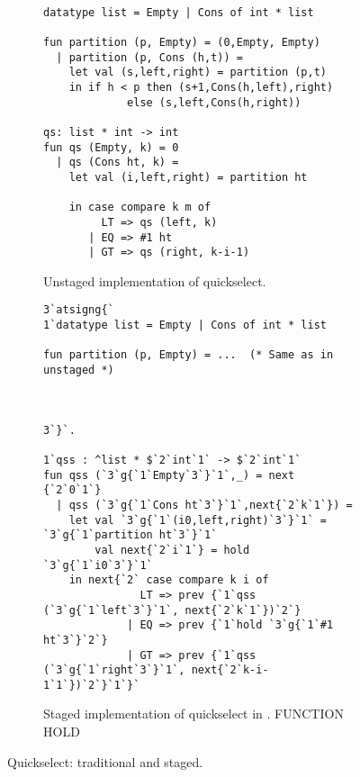 
\begin{figure*}
\begin{subfigure}[t]{0.45\textwidth}
\begin{lstlisting} 

datatype list = Empty | Cons of int * list

fun partition (p, Empty) = (0,Empty, Empty) 
  | partition (p, Cons (h,t)) = 
    let val (s,left,right) = partition (p,t) 
    in if h < p then (s+1,Cons(h,left),right) 
             else (s,left,Cons(h,right))

qs: list * int -> int
fun qs (Empty, k) = 0
  | qs (Cons ht, k) =
    let val (i,left,right) = partition ht

    in case compare k m of
         LT => qs (left, k)
       | EQ => #1 ht
       | GT => qs (right, k-i-1)
\end{lstlisting}
\caption{Unstaged implementation of quickselect.}
\label{fig:qs-unstaged}
\end{subfigure}
\hfill
\begin{subfigure}[t]{0.55\textwidth}
\begin{lstlisting} 
3`atsigng{`  
1`datatype list = Empty | Cons of int * list

fun partition (p, Empty) = ...  (* Same as in unstaged *)



3`}`.

1`qss : ^list * $`2`int`1` -> $`2`int`1`
fun qss (`3`g{`1`Empty`3`}`1`,_) = next {`2`0`1`}
  | qss (`3`g{`1`Cons ht`3`}`1`,next{`2`k`1`}) = 
    let val `3`g{`1`(i0,left,right)`3`}`1` = `3`g{`1`partition ht`3`}`1`
        val next{`2`i`1`} = hold `3`g{`1`i0`3`}`1`
    in next{`2` case compare k i of
               LT => prev {`1`qss (`3`g{`1`left`3`}`1`, next{`2`k`1`})`2`}
             | EQ => prev {`1`hold `3`g{`1`#1 ht`3`}`2`}
             | GT => prev {`1`qss (`3`g{`1`right`3`}`1`, next{`2`k-i-1`1`})`2`}`1`}`
\end{lstlisting}
\caption{Staged implementation of quickselect in \lang. FUNCTION HOLD}

\label{fig:qs-staged}
\end{subfigure}
\caption{Quickselect: traditional and staged.}
\end{figure*}

